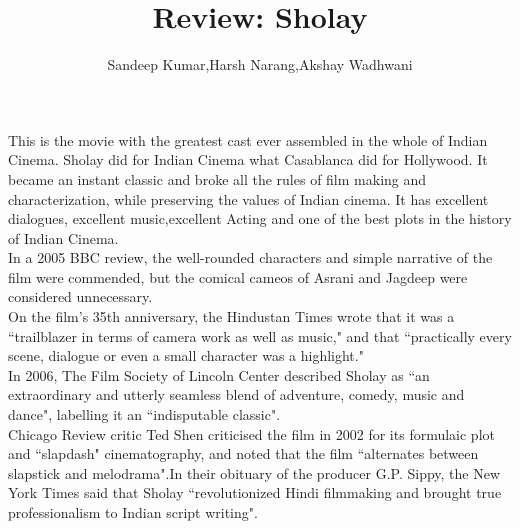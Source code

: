 \documentclass{article}
\title{Review: Sholay}
\author{Sandeep Kumar,Harsh Narang,Akshay Wadhwani}
\begin{document}
\maketitle
This is the movie with the greatest cast ever assembled in the whole of  Indian Cinema. Sholay did for Indian Cinema what Casablanca did for Hollywood. It became an instant classic and broke all the rules of film making and characterization, while preserving the values of Indian cinema. It has excellent dialogues, excellent music,excellent Acting and one of the best plots in the history of Indian Cinema.\\
In a 2005 BBC review, the well-rounded characters and simple narrative of the film were commended, but the comical cameos of Asrani and Jagdeep were considered unnecessary.\\ 
On the film's 35th anniversary, the Hindustan Times wrote that it was a ``trailblazer in terms of camera work as well as music," and that ``practically every scene, dialogue or even a small character was a highlight."\\
In 2006, The Film Society of Lincoln Center described Sholay as ``an extraordinary and utterly seamless blend of adventure, comedy, music and dance", labelling it an ``indisputable classic".\\
Chicago Review critic Ted Shen criticised the film in 2002 for its formulaic plot and ``slapdash" cinematography, and noted that the film ``alternates between slapstick and melodrama".In their obituary of the producer G.P. Sippy, the New York Times said that Sholay ``revolutionized Hindi filmmaking and brought true professionalism to Indian script writing".
\end{document}
